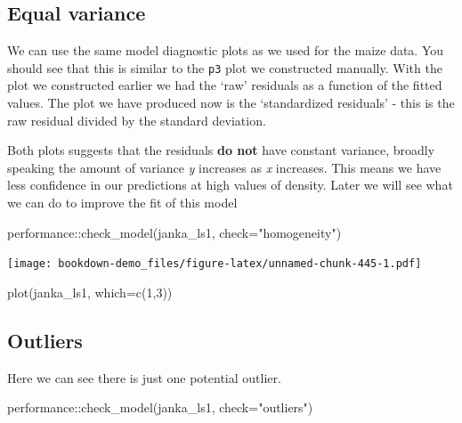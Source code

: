 \documentclass[
]{book}
\newenvironment{Shaded}{\begin{snugshade}}{\end{snugshade}}
\newcommand{\AttributeTok}[1]{\textcolor[rgb]{0.77,0.63,0.00}{#1}}
\newcommand{\DecValTok}[1]{\textcolor[rgb]{0.00,0.00,0.81}{#1}}
\newcommand{\FunctionTok}[1]{\textcolor[rgb]{0.00,0.00,0.00}{#1}}
\newcommand{\NormalTok}[1]{#1}
\newcommand{\SpecialCharTok}[1]{\textcolor[rgb]{0.00,0.00,0.00}{#1}}
\newcommand{\StringTok}[1]{\textcolor[rgb]{0.31,0.60,0.02}{#1}}
\begin{document}
\hypertarget{equal-variance-1}{%
\subsection{Equal variance}\label{equal-variance-1}}

We can use the same model diagnostic plots as we used for the maize data.
You should see that this is similar to the \texttt{p3} plot we constructed manually. With the plot we constructed earlier we had the `raw' residuals as a function of the fitted values. The plot we have produced now is the `standardized residuals' - this is the raw residual divided by the standard deviation.

Both plots suggests that the residuals \textbf{do not} have constant variance, broadly speaking the amount of variance \emph{y} increases as \emph{x} increases. This means we have less confidence in our predictions at high values of density. Later we will see what we can do to improve the fit of this model

\begin{Shaded}
\begin{Highlighting}[]
\NormalTok{performance}\SpecialCharTok{::}\FunctionTok{check\_model}\NormalTok{(janka\_ls1, }\AttributeTok{check=}\StringTok{"homogeneity"}\NormalTok{)}
\end{Highlighting}
\end{Shaded}

\texttt{[image: bookdown-demo\_files/figure-latex/unnamed-chunk-445-1.pdf]}

\begin{Shaded}
\begin{Highlighting}[]
\FunctionTok{plot}\NormalTok{(janka\_ls1, }\AttributeTok{which=}\FunctionTok{c}\NormalTok{(}\DecValTok{1}\NormalTok{,}\DecValTok{3}\NormalTok{))}
\end{Highlighting}
\end{Shaded}

\hypertarget{outliers-1}{%
\subsection{Outliers}\label{outliers-1}}

Here we can see there is just one potential outlier.

\begin{Shaded}
\begin{Highlighting}[]
\NormalTok{performance}\SpecialCharTok{::}\FunctionTok{check\_model}\NormalTok{(janka\_ls1, }\AttributeTok{check=}\StringTok{"outliers"}\NormalTok{)}
\end{Highlighting}
\end{Shaded}
\end{document}

